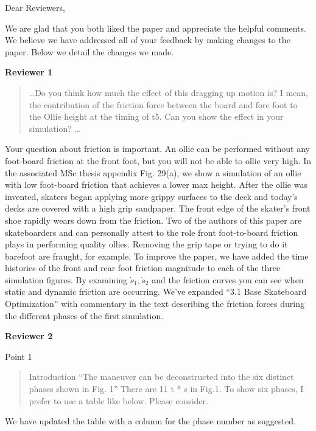 \documentclass{letter}
\begin{document}
\begin{letter}{}
\opening{Dear Reviewers,}

We are glad that you both liked the paper and appreciate the helpful comments. We believe we have addressed all of your feedback by making changes to the paper. Below we detail the changes we made.

\textbf{Reviewer 1}

\begin{quote}
\dots Do you think how much the effect of this dragging up motion is? I mean, the contribution of the friction force between the board and fore foot to the Ollie height at the timing of t5.
Can you show the effect in your simulation? \dots
\end{quote}

Your question about friction is important. An ollie can be performed without any foot-board friction at the front foot, but you will not be able to ollie very high. In the associated MSc thesis appendix Fig. 29(a), we show a simulation of an ollie with low foot-board friction that achieves a lower max height. After the ollie was invented, skaters began applying more grippy surfaces to the deck and today's decks are covered with a high grip sandpaper. The front edge of the skater's front shoe rapidly wears down from the friction. Two of the authors of this paper are skateboarders and can personally attest to the role front foot-to-board friction plays in performing quality ollies. Removing the grip tape or trying to do it barefoot are fraught, for example. To improve the paper, we have added the time histories of the front and rear foot friction magnitude to each of the three simulation figures. By examining \(\dot{s}_1,\dot{s}_2\) and the friction curves you can see when static and dynamic friction are occurring. We've expanded ``3.1 Base Skateboard Optimization'' with commentary in the text describing the friction forces during the different phases of the first simulation.

\textbf{Reviewer 2}

Point 1

\begin{quote}
    Introduction ``The maneuver can be deconstructed into the six distinct phases shown in Fig. 1'' There are 11 t * s in Fig.1. To show six phases, I prefer to use a table like below. Please consider.
\end{quote}

We have updated the table with a column for the phase number as suggested.


\end{letter}
\end{document}
